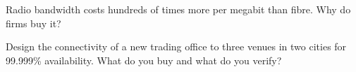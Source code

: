 \begin{interviewq}\label{iq:nw:buying-connectivity:5}
Radio bandwidth costs hundreds of times more per megabit than fibre. Why do firms buy it?
\end{interviewq}

\begin{interviewq}\label{iq:nw:buying-connectivity:6}
Design the connectivity of a new trading office to three venues in two cities for 99.999\% availability. What do you buy and what do you verify?
\end{interviewq}
